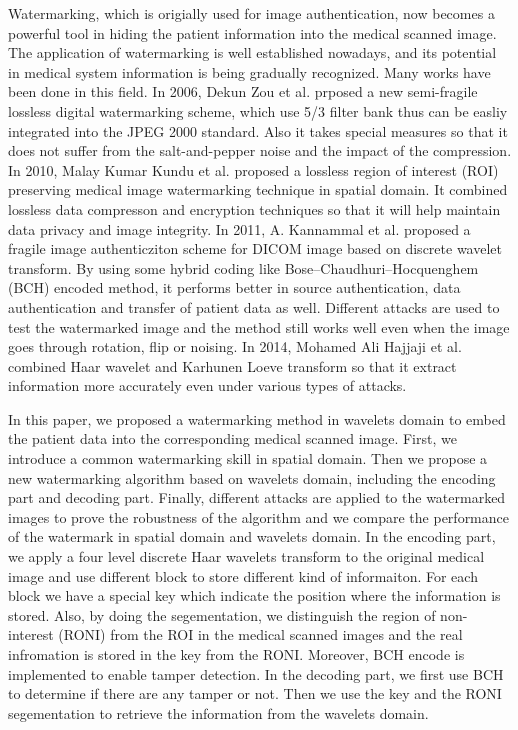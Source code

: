 \documentclass[letterpaper, 10 pt, conference]{ieeeconf}  %
\begin{document}
Watermarking, which is origially used for image authentication, now becomes a powerful tool in hiding the patient information into the medical scanned image. The application of watermarking is well established nowadays, and its potential in medical system information is being gradually recognized. Many works have been done in this field. In 2006, Dekun Zou et al. prposed a new semi-fragile lossless digital watermarking scheme, which use 5/3 filter bank thus can be easliy integrated into the JPEG 2000 standard. Also it takes special measures so that it does not suffer from the salt-and-pepper noise and the impact of the compression. In 2010, Malay Kumar Kundu et al. proposed a lossless region of interest (ROI) preserving medical image watermarking technique in spatial domain. It combined lossless data compresson and encryption techniques so that it will help maintain data privacy and image integrity. In 2011, A. Kannammal et al. proposed a fragile image authenticziton scheme for DICOM image based on discrete wavelet transform. By using some hybrid coding like Bose–Chaudhuri–Hocquenghem (BCH) encoded method, it performs better in source authentication, data authentication and transfer of patient data as well. Different attacks are used to test the watermarked image and the method still works well even when the image goes through rotation, flip or noising. In 2014, Mohamed Ali Hajjaji et al. combined Haar wavelet and Karhunen Loeve transform so that it extract information more accurately even under various types of attacks.

In this paper, we proposed a watermarking method in wavelets domain to embed the patient data into the corresponding medical scanned image. First, we introduce a common watermarking skill in spatial domain. Then we propose a new watermarking algorithm based on wavelets domain, including the encoding part and decoding part. Finally, different attacks are applied to the watermarked images to prove the robustness of the algorithm and we compare the performance of the watermark in spatial domain and wavelets domain. In the encoding part, we apply a four level discrete Haar wavelets transform to the original medical image and use different block to store different kind of informaiton. For each block we have a special key which indicate the position where the information is stored. Also, by doing the segementation, we distinguish the region of non-interest (RONI) from the ROI in the medical scanned images and the real infromation is stored in the key from the RONI. Moreover, BCH encode is implemented to enable tamper detection. In the decoding part, we first use BCH to determine if there are any tamper or not. Then we use the key and the RONI segementation to retrieve the information from the wavelets domain.
\end{document}

